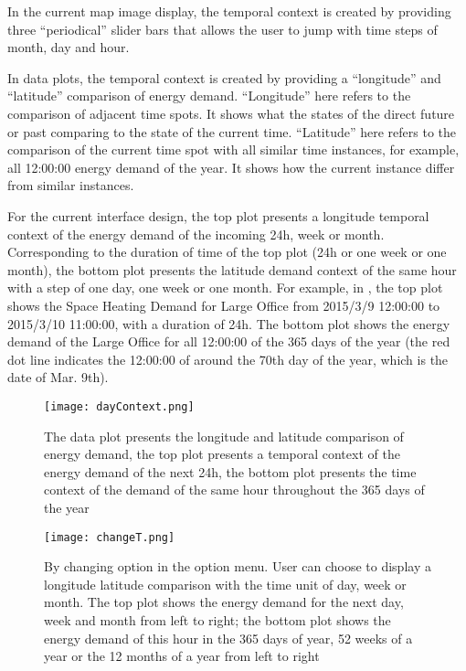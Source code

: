 In the current map image display, the temporal context is created by
providing three ``periodical'' slider bars that allows the user to
jump with time steps of month, day and hour. 

In data plots, the temporal context is created by providing a
``longitude'' and ``latitude'' comparison of energy demand.
``Longitude'' here refers to the comparison of adjacent time spots. It
shows what the states of the direct future or past comparing to the
state of the current time. ``Latitude'' here refers to the comparison
of the current time spot with all similar time instances, for example,
all 12:00:00 energy demand of the year. It shows how the current
instance differ from similar instances.

For the current interface design, the top plot presents a longitude
temporal context of the energy demand of the incoming 24h, week or
month. Corresponding to the duration of time of the top plot (24h or
one week or one month), the bottom plot presents the latitude demand
context of the same hour with a step of one day, one week or one
month. For example, in , the top plot shows the
Space Heating Demand for Large Office from 2015/3/9 12:00:00 to
2015/3/10 11:00:00, with a duration of 24h. The bottom plot shows the
energy demand of the Large Office for all 12:00:00 of the 365 days of
the year (the red dot line indicates the 12:00:00 of around the 70th
day of the year, which is the date of Mar. 9th).

\begin{figure}[h!]
  \centering
  \texttt{[image: dayContext.png]}
  \caption[Data Plot with Duration / Step of One Day]{The data plot
    presents the longitude and latitude comparison of energy demand,
    the top plot presents a temporal context of the energy demand of
    the next 24h, the bottom plot presents the time context of the
    demand of the same hour throughout the 365 days of the year}
  \label{fig:dayContext}
\end{figure}

\begin{figure}[h!]
  \centering
  \texttt{[image: changeT.png]}
  \caption[Data Plot with Different Duration / Step]{By changing
    option in the option menu. User can choose to display a longitude
    latitude comparison with the time unit of day, week or month. The
    top plot shows the energy demand for the next day, week and month
    from left to right; the bottom plot shows the energy demand of
    this hour in the 365 days of year, 52 weeks of a year or the 12
    months of a year from left to right}
  \label{fig:dayContext}
\end{figure}

